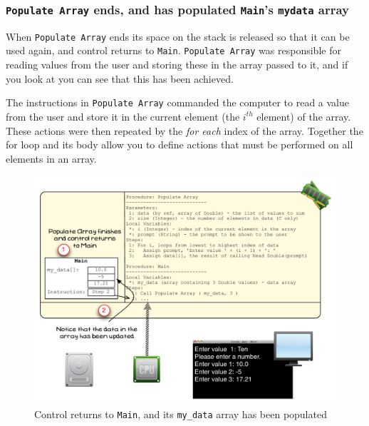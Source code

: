 
\clearpage
\subsubsection{\texttt{Populate Array} ends, and has populated \texttt{Main}'s \texttt{my{\textunderscore}data} array} %
\label{ssub:populate_array_ends_and_has_populated_main_s_my_data_array}

When \texttt{Populate Array} ends its space on the stack is released so that it can be used again, and control returns to \texttt{Main}. \texttt{Populate Array} was responsible for reading values from the user and storing these in the array passed to it, and if you look at  you can see that this has been achieved.

The instructions in \texttt{Populate Array} commanded the computer to read a value from the user and store it in the current element (the $i^{th}$ element) of the array. These actions were then repeated by the  \emph{for each} index of the array. Together the for loop and its body allow you to define actions that must be performed on all elements in an array.

\begin{figure}[htbp]
   \centering
   \includegraphics[width=\textwidth]{./topics/arrays/images/PopulateArray13} 
   \caption{Control returns to \texttt{Main}, and its \texttt{my\_data} array has been populated}
   \label{fig:populate-array-vis-13}
\end{figure}

